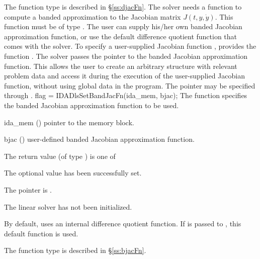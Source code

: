 {{  The function type  is described in \S\ref{ss:djacFn}.
}
The 
{\idaband} solver needs a function to compute a banded approximation to the
Jacobian matrix $J(t,y,\dot{y})$. This function must be of type . 
The user can supply his/her own banded Jacobian approximation function, 
or use the default difference quotient function
that comes with the {\idaband} solver.
To specify a user-supplied Jacobian function , {\idaband} provides
the function .
The {\idaband} solver passes the pointer 
to the banded Jacobian approximation function. This allows the user to
create an arbitrary structure with relevant problem data and access it
during the execution of the user-supplied Jacobian function, without using
global data in the program.  The pointer  may be 
specified through .
{
  flag = IDADlsSetBandJacFn(ida\_mem, bjac);
}
{
  The function  specifies the banded Jacobian
  approximation function to be used.
}
{
  \begin{args}
  \item[ida\_mem] ()
    pointer to the {\ida} memory block.
  \item[bjac] ()
    user-defined banded Jacobian approximation function.
  \end{args}
}
{
  The return value  (of type ) is one of
  \begin{args}
  \item[\Id{IDADLS\_SUCCESS}] 
    The optional value has been successfully set.
  \item[\Id{IDADLS\_MEM\_NULL}]
    The  pointer is .
  \item[\Id{IDADLS\_LMEM\_NULL}]
    The {\idaband} linear solver has not been initialized.
  \end{args}
}
{
  By default, {\idaband} uses an internal difference quotient function.
  If  is passed to , this default function is used.

  The function type  is described in \S\ref{ss:bjacFn}.
}

}
